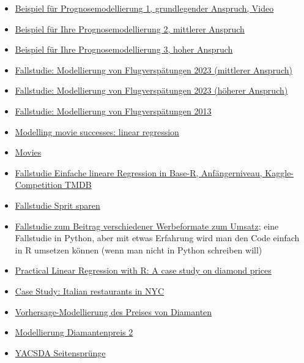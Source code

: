 \documentclass[
  a4paper,
]{scrbook}
\theoremstyle{definition}
\theoremstyle{definition}
\theoremstyle{definition}
\theoremstyle{remark}
\begin{document}
\begin{itemize}
\item
  \href{https://youtu.be/5pBTHrnRIZY}{Beispiel für Prognosemodellierung
  1, grundlegender Anspruch, Video}
\item
  \href{https://data-se.netlify.app/2020/11/13/fallstudie-zur-regressionsanalyse-ggplot2movies/}{Beispiel
  für Ihre Prognosemodellierung 2, mittlerer Anspruch}
\item
  \href{https://data-se.netlify.app/2021/03/10/fallstudie-modellierung-von-flugversp\%C3\%A4tungen/}{Beispiel
  für Ihre Prognosemodellierung 3, hoher Anspruch}
\item
  \href{https://datenwerk.netlify.app/posts/flights-delay/}{Fallstudie:
  Modellierung von Flugverspätungen 2023 (mittlerer Anspruch)}
\item
  \href{https://datenwerk.netlify.app/posts/flights-delay/}{Fallstudie:
  Modellierung von Flugverspätungen 2023 (höherer Anspruch)}
\item
  \href{https://data-se.netlify.app/2021/03/10/fallstudie-modellierung-von-flugversp\%C3\%A4tungen/}{Fallstudie:
  Modellierung von Flugverspätungen 2013}
\item
  \href{https://data-se.netlify.app/2021/02/24/modelling-movie-successes-linear-regression/}{Modelling
  movie successes: linear regression}
\item
  \href{https://data-se.netlify.app/2020/11/13/fallstudie-zur-regressionsanalyse-ggplot2movies/}{Movies}
\item
  \href{https://www.kaggle.com/code/ssauer/tmdb-simple-regression-beginners}{Fallstudie
  Einfache lineare Regression in Base-R, Anfängerniveau,
  Kaggle-Competition TMDB}
\item
  \href{https://data-se.netlify.app/2022/05/02/fallstudie-spritverbrauch/}{Fallstudie
  Sprit sparen}
\item
  \href{https://www.kaggle.com/code/saikatkumardey/linear-regression-case-study/notebook}{Fallstudie
  zum Beitrag verschiedener Werbeformate zum Umsatz}; eine Fallstudie in
  Python, aber mit etwas Erfahrung wird man den Code einfach in R
  umsetzen können (wenn man nicht in Python schreiben will)
\item
  \href{https://www.linkedin.com/pulse/practical-linear-regression-r-case-study-diamond-prices-valdeleon/?trk=public_profile_article_view}{Practical
  Linear Regression with R: A case study on diamond prices}
\item
  \href{https://stat-ata-asu.github.io/MultipleAndLogisticRegression/case-study-italian-restaurants-in-nyc.html}{Case
  Study: Italian restaurants in NYC}
\item
  \href{https://data-se.netlify.app/2021/05/19/vohrersgage-modellierung-des-preises-von-diamanten/}{Vorhersage-Modellierung
  des Preises von Diamanten}
\item
  \href{https://data-se.netlify.app/2021/05/25/modellierung-diamantenpreis-2/}{Modellierung
  Diamantenpreis 2}
\item
  \href{https://data-se.netlify.app/2021/05/28/yacsda-seitenspr\%C3\%BCnge/}{YACSDA
  Seitensprünge}
\end{itemize}
\end{document}
